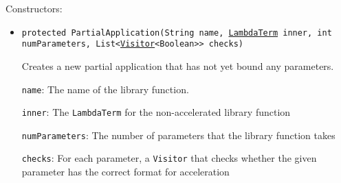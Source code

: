 Constructors:
\begin{itemize}
\item \texttt{protected PartialApplication(String name, \hyperref[type:edu.kit.wavelength.client.model.term.LambdaTerm]{LambdaTerm} inner, int numParameters, List<\hyperref[type:edu.kit.wavelength.client.model.term.Visitor]{Visitor}<Boolean>> checks)}

Creates a new partial application that has not yet bound any parameters.

\texttt{name}: The name of the library function.

\texttt{inner}: The \texttt{LambdaTerm} for the non-accelerated library function

\texttt{numParameters}: The number of parameters that the library function takes

\texttt{checks}: For each parameter, a \texttt{Visitor} that checks whether the
            given parameter has the correct format for acceleration

\end{itemize}

